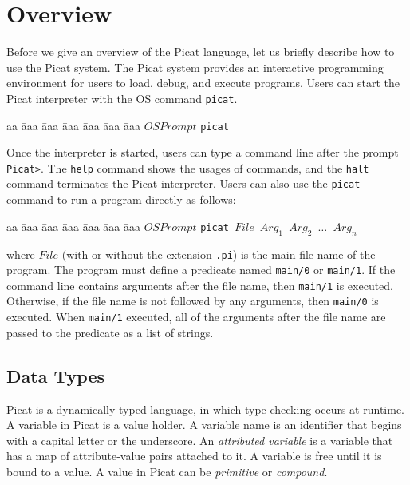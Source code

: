 \chapter{\label{chapter:overview}Overview}
Before we give an overview of the Picat language, let us briefly describe how to use the Picat system. The Picat system provides an interactive programming environment for users to load, debug, and execute programs. Users can start the Picat interpreter with the OS command \texttt{picat}.
\begin{tabbing}
aa \= aaa \= aaa \= aaa \= aaa \= aaa \= aaa \kill
\> \> $OSPrompt$ \texttt{picat}
\end{tabbing}
Once the interpreter is started, users can type a command line after the prompt \verb+Picat>+. The \texttt{help} command shows the usages of commands, and the \texttt{halt} command terminates the Picat interpreter. Users can also use the \texttt{picat} command to run a program directly as follows:
\begin{tabbing}
aa \= aaa \= aaa \= aaa \= aaa \= aaa \= aaa \kill
\> \> $OSPrompt$ \texttt{picat $File$ $Arg_1$ $Arg_2$ $\ldots$ $Arg_n$}
\end{tabbing}
where $File$ (with or without the extension \texttt{.pi}) is the main file name of the program. The program must define a predicate named \texttt{main/0} or \texttt{main/1}. If the command line contains arguments after the file name, then \texttt{main/1} is executed. Otherwise, if the file name is not followed by any arguments, then \texttt{main/0} is executed. When \texttt{main/1} executed, all of the arguments after the file name are passed to the predicate as a list of strings.


\section{Data Types}
Picat is a dynamically-typed language, in which type checking occurs at runtime. A variable in Picat is a value holder. A variable name is an identifier that begins with a capital letter or the underscore. An \emph{attributed variable} is a variable that has a map of attribute-value pairs attached to it. A variable is free until it is bound to a value. A value in Picat can be \emph{primitive} or \emph{compound}. 

